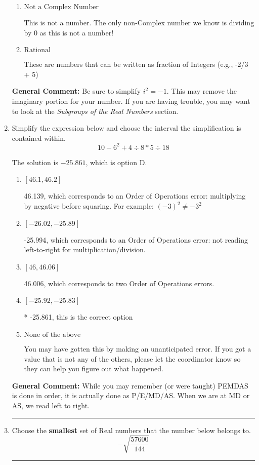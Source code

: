 \documentclass{extbook}[14pt]
\newcommand{\litem}[1]{\item #1

\rule{\textwidth}{0.4pt}}
\begin{document}
\begin{enumerate}
{\begin{enumerate}[label=\Alph*.]
This is a Complex number $(a+bi)$ that \textbf{only} has an imaginary part like $2i$.
\item \( \text{Not a Complex Number} \)

This is not a number. The only non-Complex number we know is dividing by 0 as this is not a number!
\item \( \text{Rational} \)

These are numbers that can be written as fraction of Integers (e.g., -2/3 + 5)
\end{enumerate}

\textbf{General Comment:} Be sure to simplify $i^2 = -1$. This may remove the imaginary portion for your number. If you are having trouble, you may want to look at the \textit{Subgroups of the Real Numbers} section.
}
\litem{
Simplify the expression below and choose the interval the simplification is contained within.
\[ 10 - 6^2 + 4 \div 8 * 5 \div 18 \]

The solution is \( -25.861 \), which is option D.\begin{enumerate}[label=\Alph*.]
\item \( [46.1, 46.2] \)

 46.139, which corresponds to an Order of Operations error: multiplying by negative before squaring. For example: $(-3)^2 \neq -3^2$
\item \( [-26.02, -25.89] \)

 -25.994, which corresponds to an Order of Operations error: not reading left-to-right for multiplication/division.
\item \( [46, 46.06] \)

 46.006, which corresponds to two Order of Operations errors.
\item \( [-25.92, -25.83] \)

* -25.861, this is the correct option
\item \( \text{None of the above} \)

 You may have gotten this by making an unanticipated error. If you got a value that is not any of the others, please let the coordinator know so they can help you figure out what happened.
\end{enumerate}

\textbf{General Comment:} While you may remember (or were taught) PEMDAS is done in order, it is actually done as P/E/MD/AS. When we are at MD or AS, we read left to right.
}
\litem{
Choose the \textbf{smallest} set of Real numbers that the number below belongs to.
\[ -\sqrt{\frac{57600}{144}} \]

}
\end{enumerate}
\end{document}

